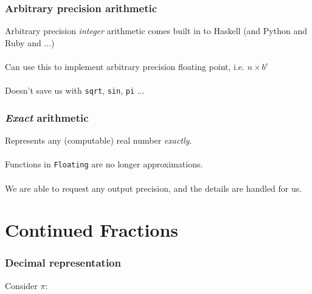 \documentclass[11pt]{beamer}
\begin{document}
\begin{frame}
\frametitle{Arbitrary precision arithmetic}
Arbitrary precision \emph{integer} arithmetic comes built in to
Haskell (and Python and Ruby and ...)
\\~\\
Can use this to implement arbitrary precision floating point, i.e. $n
\times b^c$
\\~\\
Doesn't save us with \texttt{sqrt}, \texttt{sin}, \texttt{pi} ...
\end{frame}

\begin{frame}
\frametitle{\emph{Exact} arithmetic}
Represents any (computable) real number \emph{exactly}.
\\~\\
Functions in \texttt{Floating} are no longer approximations.
\\~\\
We are able to request any output precision, and the details are
handled for us.
\end{frame}


\section{Continued Fractions}

\begin{frame}
\frametitle{Decimal representation}
Consider $\pi$:
\end{frame}
\end{document}
